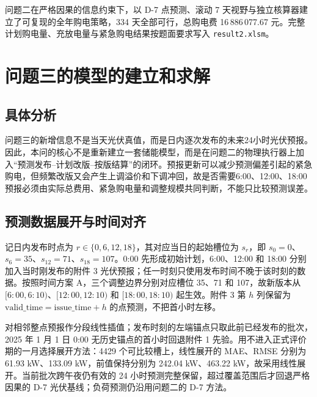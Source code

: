 \documentclass[withoutpreface,bwprint]{cumcmthesis}
\begin{document}
问题二在严格因果的信息约束下，以 D-7 点预测、滚动 7 天视野与独立核算器建立了可复现的全年购电策略，334 天全部可行，总购电费 16\,886\,077.67 元。完整计划购电量、充放电量与紧急购电结果按题面要求写入 \texttt{result2.xlsm}。




























\section{问题三的模型的建立和求解}
\subsection{具体分析}

问题三的新增信息不是当天光伏真值，而是日内逐次发布的未来24小时光伏预报。因此，本问的核心不是重新建立一套储能模型，而是在问题二的物理执行器上加入“预测发布--计划改版--按版结算”的闭环。预报更新可以减少预测偏差引起的紧急购电，但频繁改版又会产生上调溢价和下调冲回，故是否需要6:00、12:00、18:00预报必须由实际总费用、紧急购电量和调整规模共同判断，不能只比较预测误差。

\subsection{预测数据展开与时间对齐}

记日内发布时点为 $r\in\{0,6,12,18\}$，其对应当日的起始槽位为 $s_r$，即 $s_0=0$、$s_6=35$、$s_{12}=71$、$s_{18}=107$。0:00 先形成初始计划，6:00、12:00 和 18:00 分别加入当时刚发布的附件 3 光伏预报；任一时刻只使用发布时间不晚于该时刻的数据。按照时间方案 A，三个调整边界分别对应槽位 35、71 和 107，故新版本从 $[6{:}00,6{:}10)$、$[12{:}00,12{:}10)$ 和 $[18{:}00,18{:}10)$ 起生效。附件 3 第 $h$ 列保留为 $\mathrm{valid\_time}=\mathrm{issue\_time}+h$ 的点预测，不把首小时左移。

对相邻整点预报作分段线性插值；发布时刻的左端锚点只取此前已经发布的批次，2025 年 1 月 1 日 0:00 无历史锚点的首小时回退附件 1 先验。用不进入正式评价期的一月选择展开方法：4429 个可比较槽上，线性展开的 MAE、RMSE 分别为 61.93 kW、133.09 kW，前值保持分别为 242.04 kW、463.22 kW，故采用线性展开。当前批次跨午夜仍有效的 24 小时预测完整保留，超过覆盖范围后才回退严格因果的 D-7 光伏基线；负荷预测仍沿用问题二的 D-7 方法。
\end{document}
